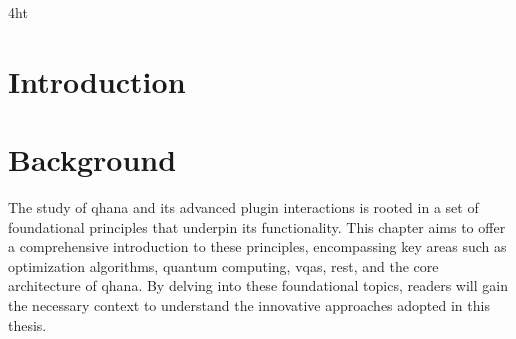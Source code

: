 \documentclass[
  a4paper,  %
  twoside,  %
  bibliography=totoc,
  headsepline,
  cleardoublepage=empty,
  parskip=half,
  draft=false
]{scrbook}
\begin{document}

\printnoidxglossaries

\iftex4ht
\else
\fi



\renewcommand*{\chapterpagestyle}{scrplain}
\pagestyle{scrheadings}
\pagestyle{scrheadings}
\ihead[]{}
\chead[]{}
\ohead[]{\headmark}
\cfoot[]{}
\ifoot[]{}

































%
%

\chapter{Introduction}
\label{chap:introduction}

\chapter{Background}
\label{chap:background}

The study of \gls{qhana} and its advanced plugin interactions is rooted in a set of foundational principles that underpin its functionality.
This chapter aims to offer a comprehensive introduction to these principles, encompassing key areas such as optimization algorithms, quantum computing, \glspl{vqa}, \gls{rest}, and the core architecture of \gls{qhana}.
By delving into these foundational topics, readers will gain the necessary context to understand the innovative approaches adopted in this thesis.
\end{document}
